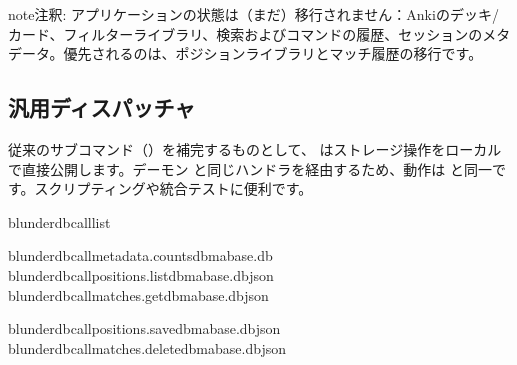 \documentclass[letterpaper,10pt,dvipdfmx]{sphinxmanual}
\begin{document}
\begin{sphinxadmonition}{note}{注釈:}
\sphinxAtStartPar
アプリケーションの状態は（まだ）移行されません：Ankiのデッキ/カード、フィルターライブラリ、検索およびコマンドの履歴、セッションのメタデータ。優先されるのは、ポジションライブラリとマッチ履歴の移行です。
\end{sphinxadmonition}


\subsection{汎用ディスパッチャ }
\label{\detokenize{mode_headless:le-dispatcher-generique-call}}\label{\detokenize{mode_headless:headless-call}}
\sphinxAtStartPar
従来のサブコマンド（{\hyperref[\detokenize{cli:cli}]{}}）を補完するものとして、 はストレージ操作をローカルで直接公開します。デーモン  と同じハンドラを経由するため、動作は  と同一です。スクリプティングや統合テストに便利です。

\begin{sphinxVerbatim}[commandchars=\\\{\}]
blunderdbcall\PYGZhy{}\PYGZhy{}list

blunderdbcallmetadata.counts\PYGZhy{}\PYGZhy{}dbma\PYGZus{}base.db
blunderdbcallpositions.list\PYGZhy{}\PYGZhy{}dbma\PYGZus{}base.db\PYGZhy{}\PYGZhy{}json
blunderdbcallmatches.get\PYGZhy{}\PYGZhy{}dbma\PYGZus{}base.db\PYGZhy{}\PYGZhy{}json

blunderdbcallpositions.save\PYGZhy{}\PYGZhy{}dbma\PYGZus{}base.db\PYGZhy{}\PYGZhy{}json
blunderdbcallmatches.delete\PYGZhy{}\PYGZhy{}dbma\PYGZus{}base.db\PYGZhy{}\PYGZhy{}json
\end{sphinxVerbatim}
\end{document}
